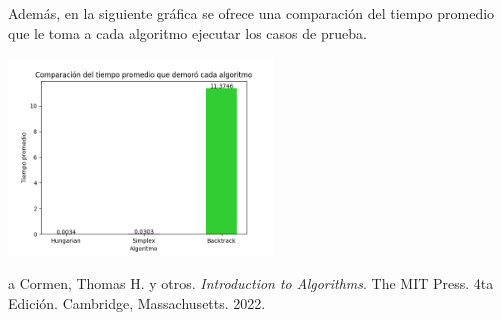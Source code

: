 \documentclass[10pt]{article} %
\begin{document}
	Adem\'as, en la siguiente gr\'afica se ofrece una comparaci\'on del tiempo promedio que le toma a cada algoritmo ejecutar los casos de prueba. 
	
	\begin{center}
		\includegraphics[width=7cm]{Bar_comparative_plot.png}
	\end{center}
	
	\begin{thebibliography}
		a
		 Cormen, Thomas H. y otros. \emph{Introduction to Algorithms}. 
		The MIT Press.
		4ta Edici\'on.		
		Cambridge, Massachusetts.
		2022.
	\end{thebibliography}
\end{document}

